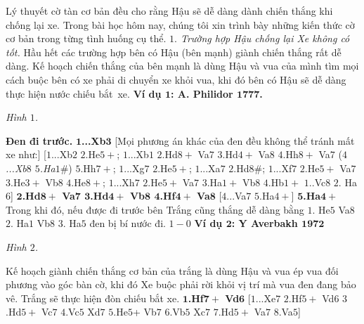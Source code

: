 \vspace*{155pt}
\begin{multicols}{2}
	Lý thuyết cờ tàn cơ bản đều cho rằng Hậu sẽ dễ dàng dành chiến thắng khi chống lại xe.
	\vskip 0.1cm
	Trong bài học hôm nay, chúng tôi xin trình bày những kiến thức cờ cơ bản trong từng tình huống cụ thể.
	\vskip 0.1cm
	\textit{$1.$ Trường hợp Hậu chống lại Xe không có tốt.}
	\vskip 0.1cm 
	Hầu hết các trường hợp bên có Hậu (bên mạnh) giành chiến thắng rất dễ dàng. Kế hoạch chiến thắng của bên mạnh là dùng Hậu và vua của mình tìm mọi cách buộc bên có xe phải di chuyển xe khỏi vua, khi đó bên có Hậu sẽ dễ dàng thực hiện nước chiếu bắt~xe.
	\vskip 0.1cm
	\textbf{\color{gocco}Ví dụ $\pmb{1}$: A. Philidor $\pmb{1777}$.}
	\begin{center}
		\newgame
		\scalebox{0.85}\showboard
		\vskip 0.1cm
		\textit{\small\color{gocco}Hình $1$.}
		\vspace*{-5pt}
	\end{center}
	\textbf{\color{gocco}Đen đi trước.}
	\vskip 0.1cm
	$\pmb{1}$\textbf{\color{gocco}...Xb}$\pmb{3}$ [Mọi phương án khác của đen đều không thể tránh mất xe như:]
	\vskip 0.1cm
	[$1$...Xb$2$ $2$.He$5+$; $1$...Xb$1$ $2$.Hd$8+$ Va$7$ $3$.Hd$4+$ Va$8$ $4$.Hh$8+$ Va$7$ (\textit{$4$...Xb$8$ $5$.Ha$1\#$}) $5$.Hh$7+$; $1$...Xg$7$ $2$.He$5+$; $1$...Xa$7$ $2$.Hd$8\#$; $1$...Xf$7$ $2$.He$5+$ Va$7$ $3$.He$3+$ Vb$8$ $4$.He$8+$; $1$...Xh$7$ $2$.He$5+$ Va$7$ $3$.Ha$1+$ Vb$8$ $4$.Hb$1+$
	$1$..Vc$8$ $2$. Ha$6$]
	\vskip 0.1cm
	$\pmb{2}$\textbf{\color{gocco}.Hd$\pmb{8+}$ Va$\pmb{7}$ $\pmb{3}$.Hd$\pmb{4+}$ Vb$\pmb{8}$ $\pmb{4}$.Hf$\pmb{4+}$ Va}$\pmb{8}$ [$4$...Va$7$ $5$.Ha$4+$]
	\vskip 0.1cm
	$\pmb{5}$\textbf{\color{gocco}.Ha}$\pmb{4+}$
	\vskip 0.1cm
	Trong khi đó, nếu được đi trước bên Trắng cũng thắng dễ dàng bằng
	\vskip 0.1cm
	$1$. He$5$ Va$8$ $2$. Ha$1$ Vb$8$ $3$. Ha$5$ đen bị bí nước đi.
	\vskip 0.1cm
	$1-0$
	\vskip 0.1cm
	\textbf{\color{gocco}Ví dụ $\pmb{2}$: Y Averbakh $\pmb{1972}$}
	\begin{center}
		\newgame
		\scalebox{0.85}\showboard
		\vskip 0.1cm
		\textit{\small\color{gocco}Hình $2$.}
	\end{center}
	Kế hoạch giành chiến thắng cơ bản của trắng là dùng Hậu và vua ép vua đối phương vào góc bàn cờ, khi đó Xe buộc phải rời khỏi vị trí mà vua đen đang bảo vê. Trắng sẽ thực hiện đòn chiếu bắt xe.
	\vskip 0.1cm
	$\pmb{1}$\textbf{\color{gocco}.Hf$\pmb{7+}$ Vd}$\pmb{6}$ [$1$...Xe$7$ $2$.Hf$5+$ Vd$6$ $3$.Hd$5+$ Vc$7$ $4$.Vc$5$ Xd$7$ $5$.He$5$+ Vb$7$ $6$.Vb$5$ Xc$7$ $7$.Hd$5+$ Va$7$ $8$.Va$5$]

\end{multicols}
